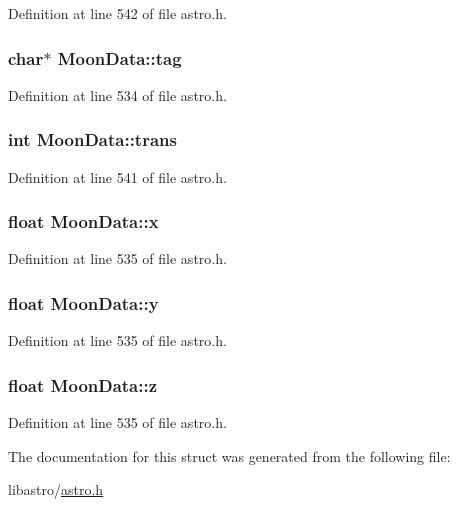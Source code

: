 Definition at line 542 of file astro.\-h.

\hypertarget{struct_moon_data_a020cf502b1c9d753437536a96e720e4f}{
\subsubsection[{tag}]{\setlength{\rightskip}{0pt plus 5cm}char$\ast$ Moon\-Data\-::tag}}\label{struct_moon_data_a020cf502b1c9d753437536a96e720e4f}


Definition at line 534 of file astro.\-h.

\hypertarget{struct_moon_data_abeabac896bfd13b42eaeb73319d045f8}{
\subsubsection[{trans}]{\setlength{\rightskip}{0pt plus 5cm}int Moon\-Data\-::trans}}\label{struct_moon_data_abeabac896bfd13b42eaeb73319d045f8}


Definition at line 541 of file astro.\-h.

\hypertarget{struct_moon_data_a110bde8aec53cfffb6c7d363132ac00e}{
\subsubsection[{x}]{\setlength{\rightskip}{0pt plus 5cm}float Moon\-Data\-::x}}\label{struct_moon_data_a110bde8aec53cfffb6c7d363132ac00e}


Definition at line 535 of file astro.\-h.

\hypertarget{struct_moon_data_ae881979990e1b8db4096669aeb9455c1}{
\subsubsection[{y}]{\setlength{\rightskip}{0pt plus 5cm}float Moon\-Data\-::y}}\label{struct_moon_data_ae881979990e1b8db4096669aeb9455c1}


Definition at line 535 of file astro.\-h.

\hypertarget{struct_moon_data_a12e475b14fd62a7f40c0a5bfa9bbe55e}{
\subsubsection[{z}]{\setlength{\rightskip}{0pt plus 5cm}float Moon\-Data\-::z}}\label{struct_moon_data_a12e475b14fd62a7f40c0a5bfa9bbe55e}


Definition at line 535 of file astro.\-h.



The documentation for this struct was generated from the following file\-:\begin{DoxyCompactItemize}
\item 
libastro/\hyperlink{astro_8h}{astro.\-h}\end{DoxyCompactItemize}
